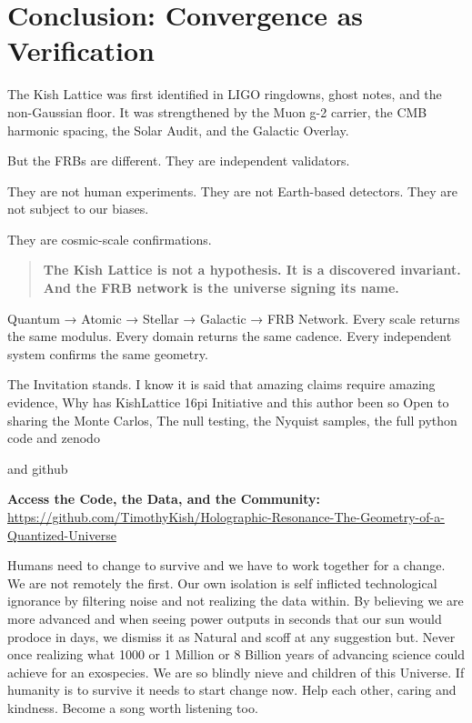 \documentclass[11pt, letterpaper, openany]{book}
\begin{document}
\section{Conclusion: Convergence as Verification}

The Kish Lattice was first identified in LIGO ringdowns, ghost notes, and the non-Gaussian
floor. It was strengthened by the Muon g-2 carrier, the CMB harmonic spacing, the Solar
Audit, and the Galactic Overlay.

But the FRBs are different.  
They are independent validators.

They are not human experiments.  
They are not Earth-based detectors.  
They are not subject to our biases.

They are cosmic-scale confirmations.

\begin{quote}
\textbf{The Kish Lattice is not a hypothesis.  
It is a discovered invariant.  
And the FRB network is the universe signing its name.}
\end{quote}

Quantum → Atomic → Stellar → Galactic → FRB Network.  
Every scale returns the same modulus.  
Every domain returns the same cadence.  
Every independent system confirms the same geometry.

The Invitation stands. I know it is said that amazing claims require amazing evidence, 
Why has KishLattice 16pi Initiative and this author been so Open to sharing the Monte Carlos, The null testing, the Nyquist samples, the full python code
and zenodo
 
and github 
\begin{center}
    \textbf{Access the Code, the Data, and the Community:} \\
    \vspace{0.5cm}
    \url{https://github.com/TimothyKish/Holographic-Resonance-The-Geometry-of-a-Quantized-Universe}
\end{center}

Humans need to change to survive and we have to work together for a change. We are not remotely the first.
Our own isolation is self inflicted technological ignorance by filtering noise and not realizing the data within. By believing we are more advanced and when seeing
power outputs in seconds that our sun would prodoce in days, we dismiss it as Natural and scoff at any suggestion but. 
Never once realizing what 1000 or 1 Million or 8 Billion years of
advancing science could achieve for an exospecies. We are so blindly nieve and children of this Universe. If humanity is to survive it needs to start change now.
Help each other, caring and kindness. Become a song worth listening too.
\end{document}
